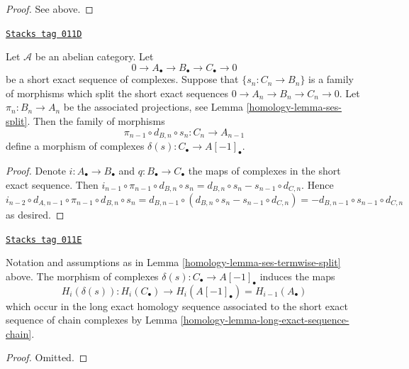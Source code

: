\begin{proof}
See above.
\end{proof}

\begin{lemma}
\label{homology-lemma-ses-termwise-split}
\href{https://stacks.math.columbia.edu/tag/011D}{\texttt{Stacks tag 011D}}

Let $\mathcal{A}$ be an abelian category.
Let
$$
0 \to A_\bullet \to B_\bullet \to C_\bullet \to 0
$$
be a short exact sequence of complexes.
Suppose that $\{s_n : C_n \to B_n\}$ is a family
of morphisms which split the short exact sequences
$0 \to A_n \to B_n \to C_n \to 0$. Let
$\pi_n : B_n \to A_n$ be the associated
projections, see Lemma \ref{homology-lemma-ses-split}.
Then the family of morphisms
$$
\pi_{n - 1} \circ d_{B, n} \circ s_n
:
C_n \to A_{n - 1}
$$
define a morphism of complexes $\delta(s) : C_\bullet \to A[-1]_\bullet$.
\end{lemma}

\begin{proof}
Denote $i : A_\bullet \to B_\bullet$ and $q : B_\bullet \to C_\bullet$
the maps of complexes in the short exact sequence. Then
$i_{n - 1} \circ \pi_{n - 1} \circ d_{B, n} \circ s_n =
d_{B, n} \circ s_n - s_{n - 1} \circ d_{C, n}$. Hence
$i_{n - 2} \circ d_{A, n - 1} \circ \pi_{n - 1} \circ d_{B, n} \circ s_n =
d_{B, n - 1} \circ (d_{B, n} \circ s_n - s_{n - 1} \circ d_{C, n}) =
- d_{B, n - 1} \circ s_{n - 1} \circ d_{C, n}$ as desired.
\end{proof}

\begin{lemma}
\label{homology-lemma-ses-termwise-split-long}
\href{https://stacks.math.columbia.edu/tag/011E}{\texttt{Stacks tag 011E}}

Notation and assumptions as in Lemma \ref{homology-lemma-ses-termwise-split} above.
The morphism of complexes $\delta(s) : C_\bullet \to A[-1]_\bullet$
induces the maps
$$
H_i(\delta(s)) :
H_i(C_\bullet) \longrightarrow H_i(A[-1]_\bullet) = H_{i - 1}(A_\bullet)
$$
which occur in the long exact homology sequence associated
to the short exact sequence of chain complexes by
Lemma \ref{homology-lemma-long-exact-sequence-chain}.
\end{lemma}

\begin{proof}
Omitted.
\end{proof}

